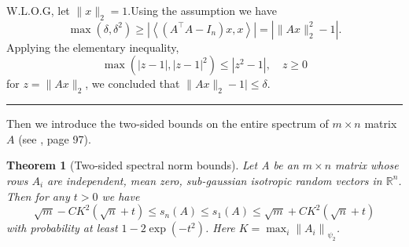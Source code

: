 \documentclass[12pt]{article}
\numberwithin{equation}{section}
\newtheorem{theorem}{Theorem}[section]
\newenvironment{proof}{{\bf Proof:}}{\hfill\rule{2mm}{2mm}}
\begin{document}
\begin{proof}
	W.L.O.G, let $\|x\|_2=1$.Using the assumption we have
	$$
	\max \left(\delta, \delta^{2}\right) \geq\left|\left\langle\left(A^{\top} A-I_{n}\right) x, x\right\rangle\right|=\left|\|A x\|_{2}^{2}-1\right|.
	$$
	Applying the elementary inequality,
	$$
	\max \left(|z-1|,|z-1|^{2}\right) \leq\left|z^{2}-1\right|, \quad z \geq 0
	$$
	for $z=\|A x\|_{2}$, we concluded that $\|A x\|_{2}-1 | \leq \delta$.
\end{proof}\newline
Then we introduce the two-sided bounds on the entire spectrum of $m\times n$ matrix $A$ (see \citet{vershynin2018high}, page 97).
\begin{theorem}[Two-sided spectral norm bounds]\label{theorem1.4}
	Let A be an $m\times n$ matrix whose rows $A_i$ are independent, mean zero, sub-gaussian isotropic random vectors in $\mathbb{R}^n$. Then for any $t>0$ we have
	\begin{equation}
	\sqrt{m}-C K^{2}(\sqrt{n}+t) \leq s_{n}(A) \leq s_{1}(A) \leq \sqrt{m}+C K^{2}(\sqrt{n}+t)
	\end{equation}
	with probability at least $1-2 \exp \left(-t^{2}\right)$. Here $K=\max _{i}\left\|A_{i}\right\|_{\psi_{2}}$.
\end{theorem}
\end{document}
